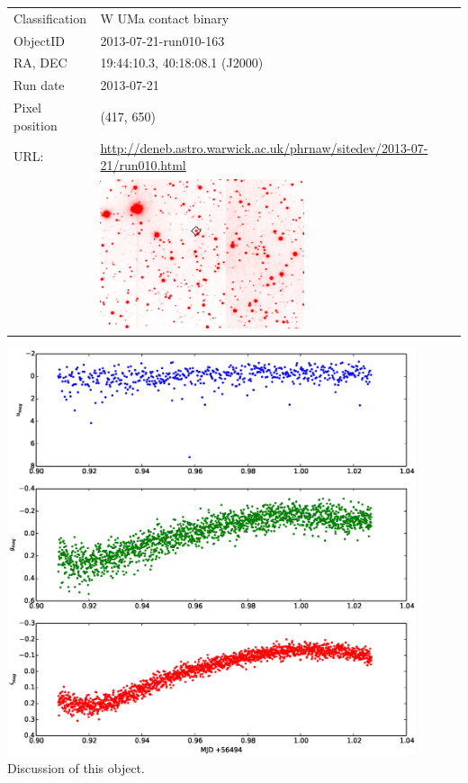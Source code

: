   \newpage
  \begin{tabular}{l l}
  Classification & {W UMa} contact binary \\
  ObjectID & 2013-07-21-run010-163 \\
  RA, DEC & 19:44:10.3, 40:18:08.1 (J2000) \\
  Run date & 2013-07-21 \\
  Pixel position & (417, 650) \\
  URL: & \small \url{http://deneb.astro.warwick.ac.uk/phrnaw/sitedev/2013-07-21/run010.html} \\
       & \includegraphics[width=60mm]{images/2013-07-21-run010-163.png} \\
  \end{tabular}
  \includegraphics[width=120mm]{images/2013-07-21-run010-163_lightcurve.eps} \\
  Discussion of this object.

